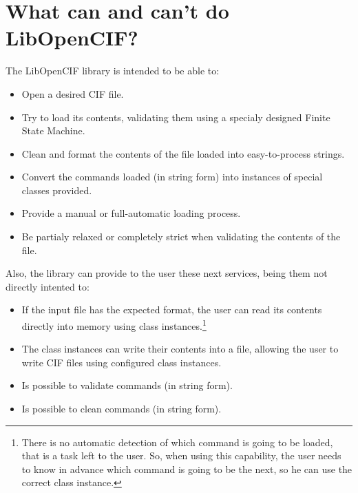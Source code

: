 \documentclass[11pt,twoside,openany,x11names,svgnames]{memoir}
\begin{document}
\section{What can and can't do LibOpenCIF?}\label{What-can-and-cant-do-LibOpenCIF}

The LibOpenCIF library is intended to be able to:

\begin{itemize}
	\item Open a desired CIF file.
	
	\item Try to load its contents, validating them using a specialy designed Finite State Machine.
	
	\item Clean and format the contents of the file loaded into easy-to-process strings.
	
	\item Convert the commands loaded (in string form) into instances of special classes provided.
	
	\item Provide a manual or full-automatic loading process.
	
	\item Be partialy relaxed or completely strict when validating the contents of the file.
\end{itemize}

Also, the library can provide to the user these next services, being them not directly intented to:

\begin{itemize}
	\item If the input file has the expected format, the user can read its contents directly into memory using class instances.\footnote{There is no automatic detection of which command is going to be loaded, that is a task left to the user. So, when using this capability, the user needs to know in advance which command is going to be the next, so he can use the correct class instance.}
	\item The class instances can write their contents into a file, allowing the user to write CIF files using configured class instances.
	\item Is possible to validate commands (in string form).
	\item Is possible to clean commands (in string form).
\end{itemize}
\end{document}
